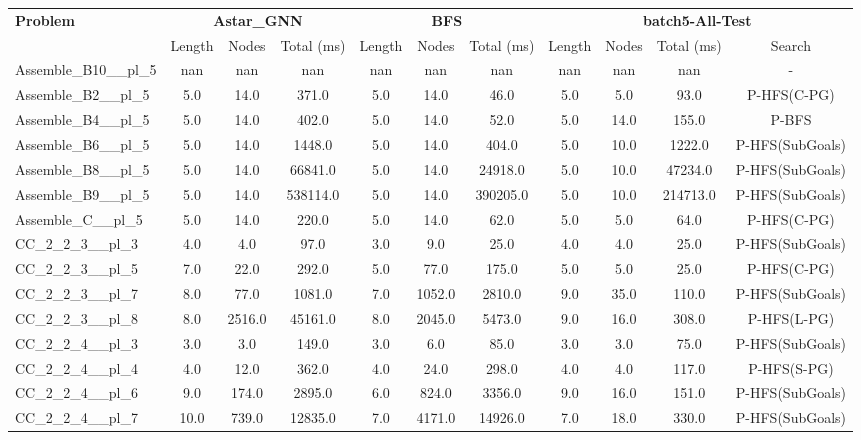 \begin{table}[!ht]
\centering
\scriptsize
\begin{tabular}{l|ccc|ccc|cccc}
\multirow{2}{*}{\textbf{Problem}} & \multicolumn{3}{c|}{\textbf{Astar\_GNN}} & \multicolumn{3}{c|}{\textbf{BFS}} & \multicolumn{4}{c}{\textbf{batch5-All-Test}} \\
\cline{2-11}
& Length & Nodes & Total (ms) & Length & Nodes & Total (ms) & Length & Nodes & Total (ms) & Search \\
\hline
Assemble\_B10\_\_pl\_5 & nan & nan & nan & nan & nan & nan & nan & nan & nan & - \\
Assemble\_B2\_\_pl\_5 & 5.0 & 14.0 & 371.0 & 5.0 & 14.0 & 46.0 & 5.0 & 5.0 & 93.0 & P-HFS(C-PG) \\
Assemble\_B4\_\_pl\_5 & 5.0 & 14.0 & 402.0 & 5.0 & 14.0 & 52.0 & 5.0 & 14.0 & 155.0 & P-BFS \\
Assemble\_B6\_\_pl\_5 & 5.0 & 14.0 & 1448.0 & 5.0 & 14.0 & 404.0 & 5.0 & 10.0 & 1222.0 & P-HFS(SubGoals) \\
Assemble\_B8\_\_pl\_5 & 5.0 & 14.0 & 66841.0 & 5.0 & 14.0 & 24918.0 & 5.0 & 10.0 & 47234.0 & P-HFS(SubGoals) \\
Assemble\_B9\_\_pl\_5 & 5.0 & 14.0 & 538114.0 & 5.0 & 14.0 & 390205.0 & 5.0 & 10.0 & 214713.0 & P-HFS(SubGoals) \\
Assemble\_C\_\_pl\_5 & 5.0 & 14.0 & 220.0 & 5.0 & 14.0 & 62.0 & 5.0 & 5.0 & 64.0 & P-HFS(C-PG) \\
CC\_2\_2\_3\_\_pl\_3 & 4.0 & 4.0 & 97.0 & 3.0 & 9.0 & 25.0 & 4.0 & 4.0 & 25.0 & P-HFS(SubGoals) \\
CC\_2\_2\_3\_\_pl\_5 & 7.0 & 22.0 & 292.0 & 5.0 & 77.0 & 175.0 & 5.0 & 5.0 & 25.0 & P-HFS(C-PG) \\
CC\_2\_2\_3\_\_pl\_7 & 8.0 & 77.0 & 1081.0 & 7.0 & 1052.0 & 2810.0 & 9.0 & 35.0 & 110.0 & P-HFS(SubGoals) \\
CC\_2\_2\_3\_\_pl\_8 & 8.0 & 2516.0 & 45161.0 & 8.0 & 2045.0 & 5473.0 & 9.0 & 16.0 & 308.0 & P-HFS(L-PG) \\
CC\_2\_2\_4\_\_pl\_3 & 3.0 & 3.0 & 149.0 & 3.0 & 6.0 & 85.0 & 3.0 & 3.0 & 75.0 & P-HFS(SubGoals) \\
CC\_2\_2\_4\_\_pl\_4 & 4.0 & 12.0 & 362.0 & 4.0 & 24.0 & 298.0 & 4.0 & 4.0 & 117.0 & P-HFS(S-PG) \\
CC\_2\_2\_4\_\_pl\_6 & 9.0 & 174.0 & 2895.0 & 6.0 & 824.0 & 3356.0 & 9.0 & 16.0 & 151.0 & P-HFS(SubGoals) \\
CC\_2\_2\_4\_\_pl\_7 & 10.0 & 739.0 & 12835.0 & 7.0 & 4171.0 & 14926.0 & 7.0 & 18.0 & 330.0 & P-HFS(SubGoals) \\

\end{tabular}
\end{table}

